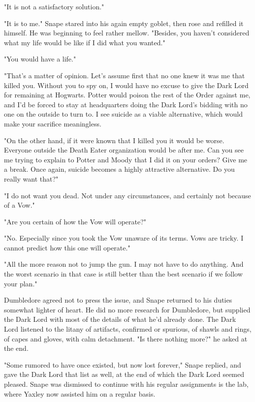 \documentclass[a4paper,11pt]{article}
\begin{document}
"It is not a satisfactory solution."

"It is to me." Snape stared into his again empty goblet, then rose and refilled it himself. He was beginning to feel rather mellow. "Besides, you haven't considered what my life would be like if I did what you wanted."

"You would have a life."

"That's a matter of opinion. Let's assume first that no one knew it was me that killed you. Without you to spy on, I would have no excuse to give the Dark Lord for remaining at Hogwarts. Potter would poison the rest of the Order against me, and I'd be forced to stay at headquarters doing the Dark Lord's bidding with no one on the outside to turn to. I see suicide as a viable alternative, which would make your sacrifice meaningless.

"On the other hand, if it were known that I killed you it would be worse. Everyone outside the Death Eater organization would be after me. Can you see me trying to explain to Potter and Moody that I did it on your orders? Give me a break. Once again, suicide becomes a highly attractive alternative. Do you really want that?"

"I do not want you dead. Not under any circumstances, and certainly not because of a Vow."

"Are you certain of how the Vow will operate?"

"No. Especially since you took the Vow unaware of its terms. Vows are tricky. I cannot predict how this one will operate."

"All the more reason not to jump the gun. I may not have to do anything. And the worst scenario in that case is still better than the best scenario if we follow your plan."

Dumbledore agreed not to press the issue, and Snape returned to his duties somewhat lighter of heart. He did no more research for Dumbledore, but supplied the Dark Lord with most of the details of what he'd already done. The Dark Lord listened to the litany of artifacts, confirmed or spurious, of shawls and rings, of capes and gloves, with calm detachment. "Is there nothing more?" he asked at the end.

"Some rumored to have once existed, but now lost forever," Snape replied, and gave the Dark Lord that list as well, at the end of which the Dark Lord seemed pleased. Snape was dismissed to continue with his regular assignments is the lab, where Yaxley now assisted him on a regular basis.
\end{document}
